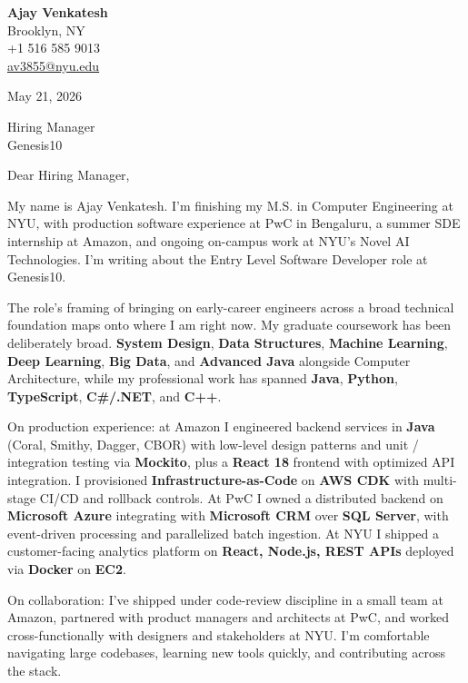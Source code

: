\documentclass[letterpaper,11pt]{article}
\begin{document}
\begin{flushleft}
\textbf{\large Ajay Venkatesh} \\
Brooklyn, NY \\
+1 516 585 9013 \\
\href{mailto:av3855@nyu.edu}{av3855@nyu.edu}
\end{flushleft}
\vspace{10pt}
May 21, 2026
\vspace{6pt}

Hiring Manager \\
Genesis10

\vspace{10pt}

Dear Hiring Manager,

My name is Ajay Venkatesh. I'm finishing my M.S. in Computer Engineering at NYU, with production software experience at PwC in Bengaluru, a summer SDE internship at Amazon, and ongoing on-campus work at NYU's Novel AI Technologies. I'm writing about the Entry Level Software Developer role at Genesis10.

The role's framing of bringing on early-career engineers across a broad technical foundation maps onto where I am right now. My graduate coursework has been deliberately broad. \textbf{System Design}, \textbf{Data Structures}, \textbf{Machine Learning}, \textbf{Deep Learning}, \textbf{Big Data}, and \textbf{Advanced Java} alongside Computer Architecture, while my professional work has spanned \textbf{Java}, \textbf{Python}, \textbf{TypeScript}, \textbf{C\#/.NET}, and \textbf{C++}.

On production experience: at Amazon I engineered backend services in \textbf{Java} (Coral, Smithy, Dagger, CBOR) with low-level design patterns and unit / integration testing via \textbf{Mockito}, plus a \textbf{React 18} frontend with optimized API integration. I provisioned \textbf{Infrastructure-as-Code} on \textbf{AWS CDK} with multi-stage CI/CD and rollback controls. At PwC I owned a distributed backend on \textbf{Microsoft Azure} integrating with \textbf{Microsoft CRM} over \textbf{SQL Server}, with event-driven processing and parallelized batch ingestion. At NYU I shipped a customer-facing analytics platform on \textbf{React, Node.js, REST APIs} deployed via \textbf{Docker} on \textbf{EC2}.

On collaboration: I've shipped under code-review discipline in a small team at Amazon, partnered with product managers and architects at PwC, and worked cross-functionally with designers and stakeholders at NYU. I'm comfortable navigating large codebases, learning new tools quickly, and contributing across the stack.
\end{document}
